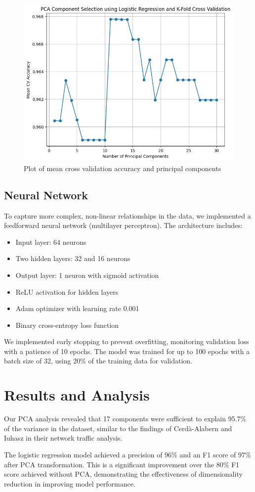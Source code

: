 \documentclass{article}
\begin{document}
\begin{figure}[H]
    \centering
    \includegraphics[width=.5\textwidth]{kfoldvalidation.png} 
    \caption{Plot of mean cross validation accuracy and principal components}
    \label{fig:kfold}
\end{figure}

\subsection{Neural Network}
To capture more complex, non-linear relationships in the data, we implemented a feedforward neural network (multilayer perceptron). The architecture includes:
\begin{itemize}
    \item Input layer: 64 neurons
    \item Two hidden layers: 32 and 16 neurons
    \item Output layer: 1 neuron with sigmoid activation
    \item ReLU activation for hidden layers
    \item Adam optimizer with learning rate 0.001
    \item Binary cross-entropy loss function
\end{itemize}

We implemented early stopping to prevent overfitting, monitoring validation loss with a patience of 10 epochs. The model was trained for up to 100 epochs with a batch size of 32, using 20\% of the training data for validation.

\section{Results and Analysis}
Our PCA analysis revealed that 17 components were sufficient to explain 95.7\% of the variance in the dataset, similar to the findings of Cerdà-Alabern and Iuhasz in their network traffic analysis.

The logistic regression model achieved a precision of 96\% and an F1 score of 97\% after PCA transformation. This is a significant improvement over the 80\% F1 score achieved without PCA, demonstrating the effectiveness of dimensionality reduction in improving model performance.
\end{document}
